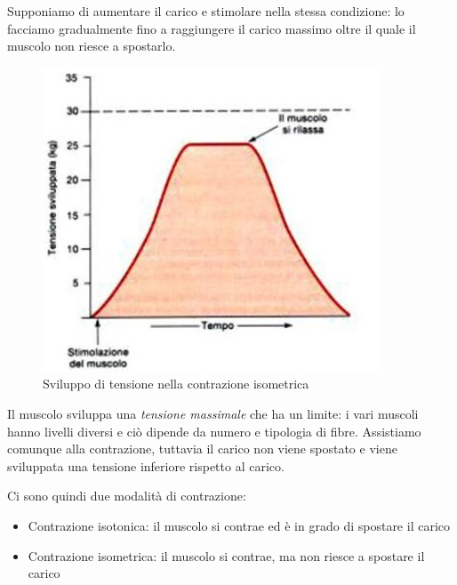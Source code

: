 \documentclass[a4paper,12pt]{article}
\begin{document}
Supponiamo di aumentare il carico e stimolare nella stessa condizione: lo facciamo gradualmente fino a raggiungere il carico massimo oltre il quale il muscolo non riesce a spostarlo. 

\begin{figure}[H]
\centering
\includegraphics[scale=0.4]{immagine/isotonica.jpg}
\caption{Sviluppo di tensione nella contrazione isometrica}
\end{figure}

Il muscolo sviluppa una \emph{tensione massimale} che ha un limite: i vari muscoli hanno livelli diversi e ciò dipende da numero e tipologia di fibre. Assistiamo comunque alla contrazione, tuttavia il carico non viene spostato e viene sviluppata una tensione inferiore rispetto al carico. 

Ci sono quindi due modalità di contrazione:
\begin{itemize}
\item{Contrazione isotonica: il muscolo si contrae ed è in grado di spostare il carico}
\item{Contrazione isometrica: il muscolo si contrae, ma non riesce a spostare il carico}
\end{itemize}
\end{document}

